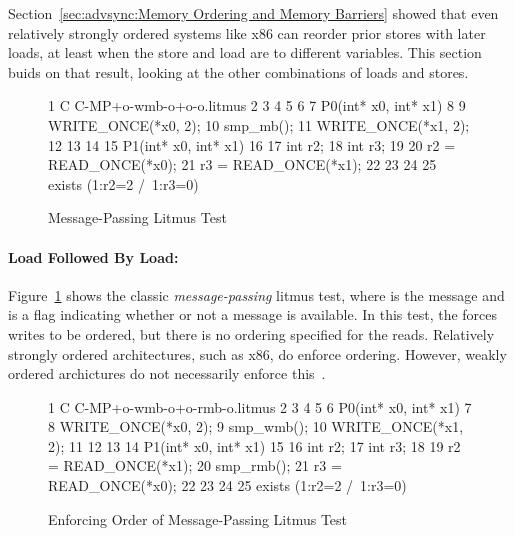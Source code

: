Section~\ref{sec:advsync:Memory Ordering and Memory Barriers}
showed that even relatively strongly ordered systems like x86
can reorder prior stores with later loads, at least when the
store and load are to different variables.
This section buids on that result, looking at the other combinations of
loads and stores.


\begin{figure}[tbp]
{ \scriptsize
\begin{verbbox}
 1 C C-MP+o-wmb-o+o-o.litmus
 2
 3 {
 4 }
 5
 6
 7 P0(int* x0, int* x1) {
 8
 9   WRITE_ONCE(*x0, 2);
10   smp_mb();
11   WRITE_ONCE(*x1, 2);
12
13 }
14
15 P1(int* x0, int* x1) {
16
17   int r2;
18   int r3;
19
20   r2 = READ_ONCE(*x0);
21   r3 = READ_ONCE(*x1);
22
23 }
24
25 exists (1:r2=2 /\ 1:r3=0)
\end{verbbox}
}
\centering
\theverbbox
\caption{Message-Passing Litmus Test}
\label{fig:advsync:Message-Passing Litmus Test}
\end{figure}

\paragraph{Load Followed By Load:}
Figure~\ref{fig:advsync:Message-Passing Litmus Test}
shows the classic \emph{message-passing} litmus test, where  is
the message and  is a flag indicating whether or not a message
is available.
In this test, the  forces  writes to be ordered,
but there is no ordering specified for the reads.
Relatively strongly ordered architectures, such as x86, do enforce ordering.
However, weakly ordered archictures do not necessarily enforce
this~\cite{JadeAlglave2011ppcmem}.

\begin{figure}[tbp]
{ \scriptsize
\begin{verbbox}
 1 C C-MP+o-wmb-o+o-rmb-o.litmus
 2
 3 {
 4 }
 5
 6 P0(int* x0, int* x1) {
 7
 8   WRITE_ONCE(*x0, 2);
 9   smp_wmb();
10   WRITE_ONCE(*x1, 2);
11
12 }
13
14 P1(int* x0, int* x1) {
15
16   int r2;
17   int r3;
18
19   r2 = READ_ONCE(*x1);
20   smp_rmb();
21   r3 = READ_ONCE(*x0);
22
23 }
24
25 exists (1:r2=2 /\ 1:r3=0)
\end{verbbox}
}
\centering
\theverbbox
\caption{Enforcing Order of Message-Passing Litmus Test}
\label{fig:advsync:Enforcing Order of Message-Passing Litmus Test}
\end{figure}


